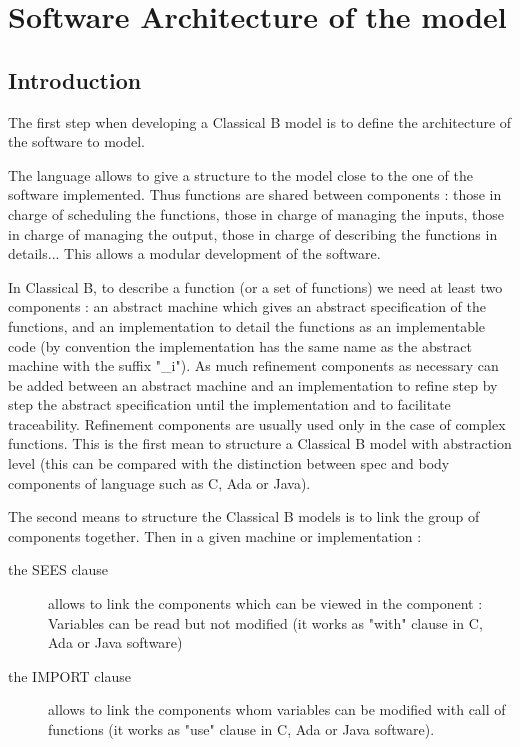 \section{Software Architecture of the model}

\subsection{Introduction}

The first step when developing a Classical B  model is to define the architecture of the software to model.

The language allows to give a structure to the model close to the one of the software implemented.
Thus functions are shared between components : those in charge of scheduling the functions, those in charge of managing the inputs, those in charge of managing the output, those in charge of describing the functions in details...  This allows a modular development of the software.

In Classical B, to describe a function (or a set of functions) we need at least two components :  an abstract machine which gives an abstract specification of the functions, and an implementation to detail the functions as an implementable code (by convention the implementation has the same name as the abstract machine with the suffix "\_i"). As much refinement components as necessary can be added between an abstract machine and an implementation to refine step by step the abstract specification until the implementation and to facilitate traceability. Refinement components are usually used only in the case of complex functions. This is the first mean to structure a Classical B model with abstraction level (this can be compared with the distinction between spec and body components of language such as C, Ada or Java).

The second means to structure the Classical B  models is to link the group of components together. Then in a given machine or implementation :
\begin{description}
\item[the SEES clause] allows to link the components which can be viewed in the component : Variables can be read but not modified (it works as "with" clause in C, Ada or Java software)
\item[the IMPORT clause] allows to link the components whom variables can be modified with call of functions (it works as "use" clause in C, Ada or Java software).
\end{description}


